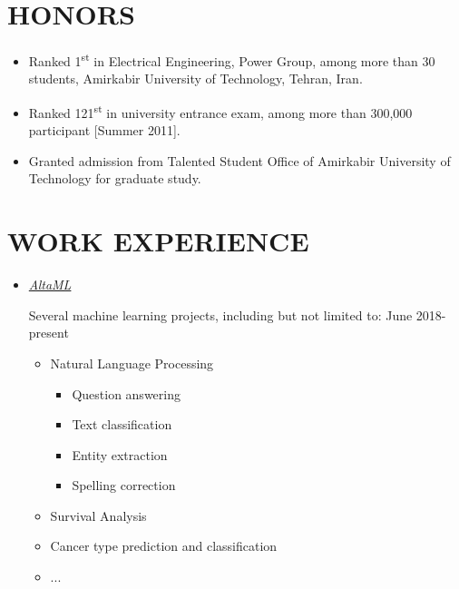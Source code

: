 \documentclass[10pt,a4paper,sans]{moderncv} %
\begin{document}
	\section{HONORS}
	
	\begin{itemize}
		\item Ranked 1\textsuperscript{st} in Electrical Engineering, Power Group, among more than 30 students,
		Amirkabir University of Technology, Tehran, Iran.
		
		\item Ranked 121\textsuperscript{st} in university entrance exam, among more than 300,000
		participant [Summer 2011].
		
		\item Granted admission from Talented Student Office of Amirkabir University of Technology for graduate study. \\
	\end{itemize}
	
	\vspace{-1 em}
	\section{WORK EXPERIENCE}
	\begin{itemize}
		\item \href{http://altaml.com/}{ \emph{AltaML}}
		
		Several machine learning projects, including but not limited to: \hfill June 2018-present
		\begin{itemize}
			\item Natural Language Processing
			\begin{itemize}
				\item Question answering
				\item Text classification
				\item Entity extraction
				\item Spelling correction
			\end{itemize}
			
			\item Survival Analysis
			\item Cancer type prediction and classification
			\item ...
		\end{itemize}
	\end{itemize}
	
\end{document}
